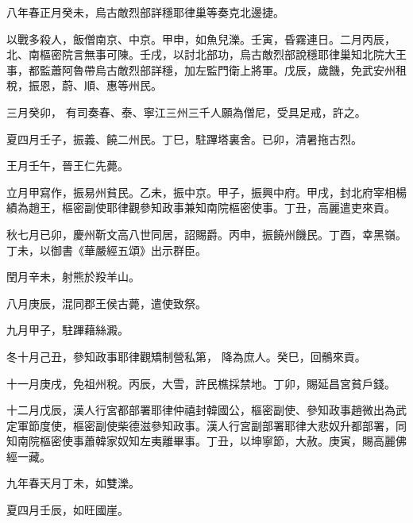 
\begin{pinyinscope}

 八年春正月癸未，烏古敵烈部詳穩耶律巢等奏克北邊捷。



 以戰多殺人，飯僧南京、中京。甲申，如魚兒濼。壬寅，昏霧連日。二月丙辰，北、南樞密院言無事可陳。壬戌，以討北部功，烏古敵烈部說穩耶律巢知北院大王事，都監蕭阿魯帶烏古敵烈部詳穩，加左監門衛上將軍。戊辰，歲饑，免武安州租稅，振恩，蔚、順、惠等州民。



 三月癸卯，
 有司奏春、泰、寧江三州三千人願為僧尼，受具足戒，許之。



 夏四月壬子，振義、饒二州民。丁巳，駐蹕塔裏舍。已卯，清暑拖古烈。



 王月壬午，晉王仁先薨。



 立月甲寫作，振易州貧民。乙未，振中京。甲子，振興中府。甲戌，封北府宰相楊績為趙王，樞密副使耶律觀參知政事兼知南院樞密使事。丁丑，高麗遣吏來貢。



 秋七月已卯，慶州靳文高八世同居，詔賜爵。丙申，振饒州饑民。丁酉，幸黑嶺。丁未，以御書《華嚴經五頌》出示群臣。



 閏月辛未，射熊於羖羊山。



 八月庚辰，混同郡王侯古薨，遣使致祭。



 九月甲子，駐蹕藉絲澱。



 冬十月己丑，參知政事耶律觀矯制營私第，
 降為庶人。癸巳，回鶻來貢。



 十一月庚戌，免祖州稅。丙辰，大雪，許民樵採禁地。丁卯，賜延昌宮貧戶錢。



 十二月戊辰，漢人行宮都部署耶律仲禧封韓國公，樞密副使、參知政事趙微出為武定軍節度使，樞密副使柴德滋參知政事。漢人行宮副部署耶律大悲奴升都部署，同知南院樞密使事蕭韓家奴知左夷離畢事。丁丑，以坤寧節，大赦。庚寅，賜高麗佛經一藏。



 九年春天月丁未，如雙濼。



 夏四月壬辰，如旺國崖。




\end{pinyinscope}
